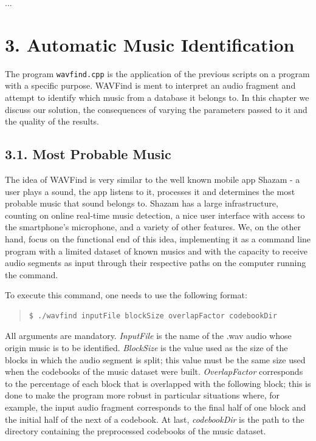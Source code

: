 \documentclass[12pt]{article}
\begin{document}
...

\newpage
\section*{3. Automatic Music Identification}

The program \texttt{wavfind.cpp} is the application of the previous scripts on a 
program with a specific purpose.
WAVFind is ment to interpret an audio fragment and attempt to identify which music 
from a database it belongs to.
In this chapter we discuss our solution, the consequences of varying the 
parameters passed to it and the quality of the results.

\subsection*{3.1. Most Probable Music}

The idea of WAVFind is very similar to the well known mobile app Shazam 
\cite{shazam} - a user plays a sound, the app listens to it, processes it and
determines the most probable music that sound belongs to.
Shazam has a large infrastructure, counting on online real-time music detection,
a nice user interface with access to the smartphone's microphone, and a variety
of other features.
We, on the other hand, focus on the functional end of this idea, implementing
it as a command line program with a limited dataset of known musics and with
the capacity to receive audio segments as input through their respective paths 
on the computer running the command.

To execute this command, one needs to use the following format:

\begingroup
\addtolength\leftmargini{-0.4in}
\begin{quote}
\begin{verbatim}
$ ./wavfind inputFile blockSize overlapFactor codebookDir
\end{verbatim}
\end{quote}
\endgroup

All arguments are mandatory. 
{\it InputFile\/} is the name of the .wav audio whose origin music is to be identified.
{\it BlockSize\/} is the value used as the size of the blocks in which the audio 
segment is split; this value must be the same size used when the codebooks of 
the music dataset were built.
{\it OverlapFactor\/} corresponds to the percentage of each block that is 
overlapped with the following block; this is done to make the program more 
robust in particular situations where, for example, the input audio fragment 
corresponds to the final half of one block and the initial half of the next of a 
codebook.
At last, {\it codebookDir\/} is the path to the directory containing the 
preprocessed codebooks of the music dataset.
\end{document}
